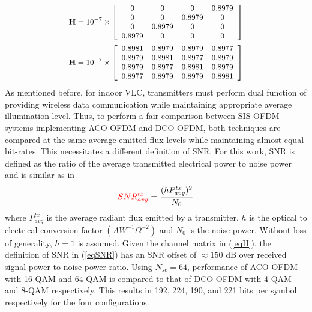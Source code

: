 \documentclass[12pt,letterpaper,onecolumn]{article} %
\newcommand{\vm}[1]{{\bf{#1}}}
\begin{document}
\begin{subequations}
\small
\begin{align}
	\vm{H} = 10^{-7}\times\left[
	                      \begin{array}{cccc}
												0&0&0&0.8979\\
												0&0&0.8979&0\\
												0&0.8979&0&0\\
												0.8979&0&0&0
												\end{array}
												\right]\label{eqHimr}\\
	\vm{H} = 10^{-7}\times\left[
	                      \begin{array}{cccc}
												0.8981&0.8979&0.8979&0.8977\\
												0.8979&0.8981&0.8977&0.8979\\
												0.8979&0.8977&0.8981&0.8979\\
												0.8977&0.8979&0.8979&0.8981
												\end{array}
												\right]\label{eqHnimr}
\end{align}
\label{eqH}
\end{subequations}
{\color{red}As mentioned before, for indoor VLC, transmitters must perform dual function of providing wireless data communication while maintaining appropriate average illumination level. Thus, to perform a fair comparison between SIS-OFDM systems implementing ACO-OFDM and DCO-OFDM, both techniques are compared at the same average emitted flux levels while maintaining almost equal bit-rates. This necessitates a different definition of SNR. For this work, SNR is defined as the ratio of the average transmitted electrical power to noise power and is similar as in \cite{fat13a}}
\begin{equation}
	\label{eqSNR}
	{\color{red}SNR^{tx}_{avg}} = \frac{(hP_{avg}^{tx})^2}{N_{0}}
\end{equation}
where $P_{avg}^{tx}$ is the average radiant flux emitted by a transmitter, $h$ is the optical to electrical conversion factor $(AW^{-1}\Omega^{-2})$ and $N_0$ is the noise power. Without loss of generality, $h=1$ is assumed. Given the channel matrix in (\ref{eqH}), the definition of SNR in (\ref{eqSNR}) has an SNR offset of $\approx 150$ dB over received signal power to noise power ratio. {\color{red}Using $N_{sc}=64$, performance of ACO-OFDM with 16-QAM and 64-QAM is compared to that of DCO-OFDM with 4-QAM and 8-QAM respectively. This results in 192, 224, 190, and 221 bits per symbol respectively for the four configurations.}
\end{document}
